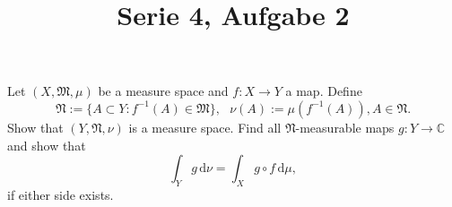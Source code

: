 \documentclass[10pt]{article}\usepackage[]{graphicx}\usepackage[]{color}
\title{Serie 4, Aufgabe 2}
\date{}
\newcommand{\C}{\mathbb{C}}
\newcommand{\df}{\,\textrm{d}}
\begin{document}
\maketitle

Let $(X, \mathfrak{M}, \mu)$ be a measure space
and $f : X \to Y$ a map.
Define
\[
  \mathfrak{N} := \{A \subset Y : f^{-1}(A) \in \mathfrak{M}\},~~~
  \nu(A) := \mu(f^{-1}(A)), A \in \mathfrak{N}.
\]
Show that $(Y, \mathfrak{N}, \nu)$ is a measure space.
Find all $\mathfrak{N}$-measurable maps $g: Y \to \C$
and show that 
\[
  \int_Y g \df \nu = \int_X g \circ f \df \mu,
\]
if either side exists.
\end{document}
